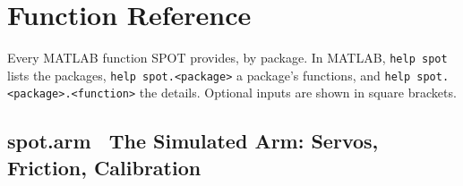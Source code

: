 \documentclass[11pt,a4paper]{article}
\newcommand{\fn}[1]{\texttt{#1}}
\begin{document}
\appendix
\section{Function Reference}\label{app:functions}
Every MATLAB function SPOT provides, by package. In MATLAB, \fn{help spot} lists the packages,
\fn{help spot.<package>} a package's functions, and \fn{help spot.<package>.<function>} the details.
Optional inputs are shown in square brackets.

\subsection*{spot.arm \textmd{\textendash\ The Simulated Arm: Servos, Friction, Calibration}}
\end{document}
